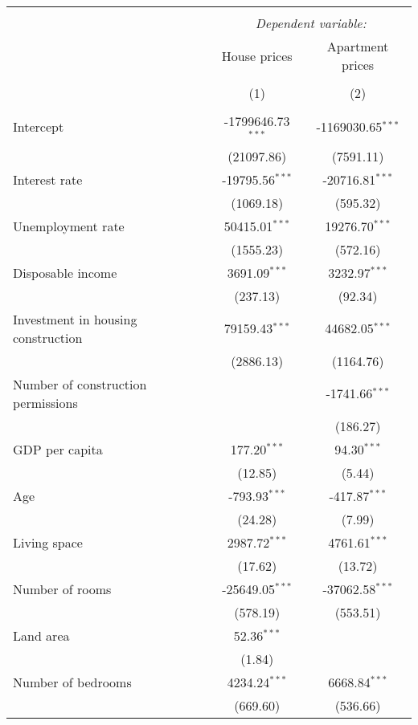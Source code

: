 \begin{table}[!htbp] \centering
\begin{tabular}{@{\extracolsep{5pt}}lcc}
\\[-1.8ex]\hline
\hline \\[-1.8ex]
& \multicolumn{2}{c}{\textit{Dependent variable:}} \
\cr \cline{2-3}
\\[-1.8ex] & \multicolumn{1}{c}{House prices} & \multicolumn{1}{c}{Apartment prices}  \\
\\[-1.8ex] & (1) & (2) \\
\hline \\[-1.8ex]
 Intercept & -1799646.73$^{***}$ & -1169030.65$^{***}$ \\
  & (21097.86) & (7591.11) \\
 Interest rate & -19795.56$^{***}$ & -20716.81$^{***}$ \\
  & (1069.18) & (595.32) \\
 Unemployment rate & 50415.01$^{***}$ & 19276.70$^{***}$ \\
  & (1555.23) & (572.16) \\
 Disposable income & 3691.09$^{***}$ & 3232.97$^{***}$ \\
  & (237.13) & (92.34) \\
 Investment in housing construction & 79159.43$^{***}$ & 44682.05$^{***}$ \\
  & (2886.13) & (1164.76) \\
 Number of construction permissions & & -1741.66$^{***}$ \\
  & & (186.27) \\
 GDP per capita & 177.20$^{***}$ & 94.30$^{***}$ \\
  & (12.85) & (5.44) \\
 Age & -793.93$^{***}$ & -417.87$^{***}$ \\
  & (24.28) & (7.99) \\
 Living space & 2987.72$^{***}$ & 4761.61$^{***}$ \\
  & (17.62) & (13.72) \\
 Number of rooms & -25649.05$^{***}$ & -37062.58$^{***}$ \\
  & (578.19) & (553.51) \\
 Land area & 52.36$^{***}$ & \\
  & (1.84) & \\
 Number of bedrooms & 4234.24$^{***}$ & 6668.84$^{***}$ \\
  & (669.60) & (536.66) \\

\end{tabular}
\end{table}
